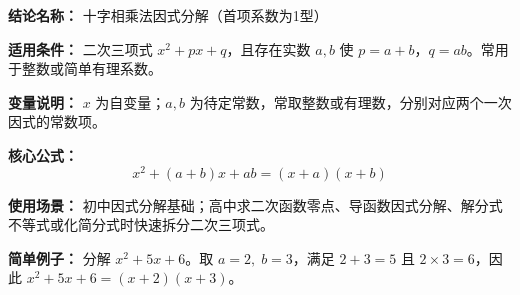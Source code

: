 \textbf{结论名称：} 十字相乘法因式分解（首项系数为1型）

\textbf{适用条件：} 二次三项式 $x^2+px+q$，且存在实数 $a,b$ 使 $p=a+b$，$q=ab$。常用于整数或简单有理系数。

\textbf{变量说明：} $x$ 为自变量；$a,b$ 为待定常数，常取整数或有理数，分别对应两个一次因式的常数项。

\textbf{核心公式：} 
\[ \boxed{x^{2}+(a+b)x+ab=(x+a)(x+b)} \]

\textbf{使用场景：} 初中因式分解基础；高中求二次函数零点、导函数因式分解、解分式不等式或化简分式时快速拆分二次三项式。

\textbf{简单例子：} 分解 $x^{2}+5x+6$。取 $a=2,\;b=3$，满足 $2+3=5$ 且 $2\times3=6$，因此 
$x^{2}+5x+6=(x+2)(x+3)$。
